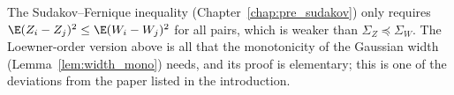 \begin{remark}\label{rem:pg_comparison_vs_sf}
The Sudakov--Fernique inequality (Chapter~\ref{chap:pre_sudakov}) only requires
$\E(Z_i - Z_j)^2 \le \E(W_i - W_j)^2$ for all pairs, which is weaker than
$\Sigma_Z \preceq \Sigma_W$. The Loewner-order version above is all that the monotonicity of
the Gaussian width (Lemma~\ref{lem:width_mono}) needs, and its proof is elementary; this is
one of the deviations from the paper listed in the introduction.
\end{remark}
